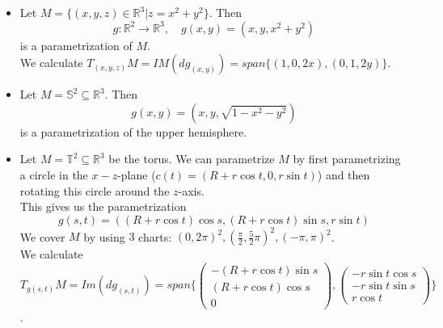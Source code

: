 \begin{example}\label{4.6}
    \begin{itemize}
        \item Let $M=\{(x,y,z)\in\mathbb{R}^3|z=x^2+y^2\}$. Then
        \[g:\mathbb{R}^2\to \mathbb{R}^3,\quad g(x,y)=(x,y,x^2+y^2)\]
        is a parametrization of $M$.\\
        We calculate $T_{(x,y,z)}M=IM(dg_{(x,y)})=span\{(1,0,2x),(0,1,2y)\}$.\\
        \item Let $M=\mathbb{S}^2\subseteq \mathbb{R}^3$. Then
        \[g(x,y)=(x,y,\sqrt{1-x^2-y^2})\]
        is a parametrization of the upper hemisphere.\\
        \item Let $M=\mathbb{T}^2\subseteq \mathbb{R}^3$ be the torus. We can parametrize $M$ by first parametrizing a circle in the $x-z$-plane ($c(t)=(R+r\cos t,0,r\sin t)$) and then rotating this circle around the $z$-axis.\\
        This gives us the parametrization
        \[g(s,t)=((R+r\cos t)\cos s,(R+r\cos t)\sin s,r\sin t)\]
        We cover $M$ by using $3$ charts: $(0,2\pi)^2,(\frac{\pi}{2},\frac{5}{2}\pi)^2,(-\pi,\pi)^2$.\\
        We calculate $T_{g(s,t)}M=Im(dg_{(s,t)})=span\{\begin{pmatrix}
            -(R+r\cos t)\sin s\\(R+r\cos t)\cos s\\
            0
        \end{pmatrix},\begin{pmatrix}
            -r\sin t\cos s\\-r\sin t\sin s\\r\cos t
        \end{pmatrix}\}$.
    \end{itemize}
\end{example}
